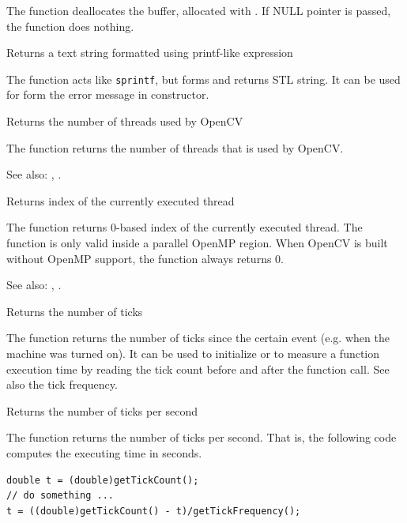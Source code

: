 The function deallocates the buffer, allocated with .
If NULL pointer is passed, the function does nothing.

Returns a text string formatted using printf-like expression

\begin{description}
\end{description}

The function acts like \texttt{sprintf}, but forms and returns STL string. It can be used for form the error message in  constructor.

Returns the number of threads used by OpenCV


The function returns the number of threads that is used by OpenCV.

See also: , .


Returns index of the currently executed thread


The function returns 0-based index of the currently executed thread. The function is only valid inside a parallel OpenMP region. When OpenCV is built without OpenMP support, the function always returns 0.

See also: , .

Returns the number of ticks


The function returns the number of ticks since the certain event (e.g. when the machine was turned on).
It can be used to initialize  or to measure a function execution time by reading the tick count before and after the function call. See also the tick frequency.

Returns the number of ticks per second


The function returns the number of ticks per second.
That is, the following code computes the executing time in seconds.
\begin{lstlisting}
double t = (double)getTickCount();
// do something ...
t = ((double)getTickCount() - t)/getTickFrequency();
\end{lstlisting}

